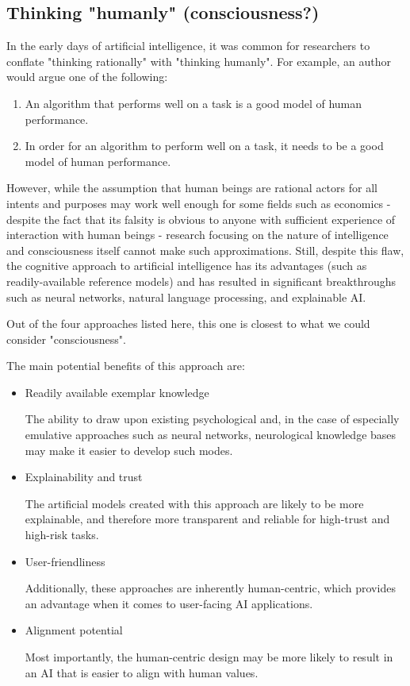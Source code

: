 \documentclass[masterthesis]{fer}
\begin{document}
\subsection{Thinking "humanly" (consciousness?)}
In the early days of artificial intelligence, it was common for researchers to conflate "thinking rationally" with "thinking humanly". For example, an author would argue one of the following:
\begin{enumerate}
\item{An algorithm that performs well on a task is a good model of human performance.}
\item{In order for an algorithm to perform well on a task, it needs to be a good model of human performance.}
\end{enumerate}
However, while the assumption that human beings are rational actors for all intents and purposes may work well enough for some fields such as economics - despite the fact that its falsity is obvious to anyone with sufficient experience of interaction with human beings - research focusing on the nature of intelligence and consciousness itself cannot make such approximations.
Still, despite this flaw, the cognitive approach to artificial intelligence has its advantages (such as readily-available reference models) and has resulted in significant breakthroughs such as neural networks, natural language processing, and explainable AI.

Out of the four approaches listed here, this one is closest to what we could consider "consciousness".

The main potential benefits of this approach are:
\begin{itemize}
\item{Readily available exemplar knowledge}

The ability to draw upon existing psychological and, in the case of especially emulative approaches such as neural networks, neurological knowledge bases may make it easier to develop such modes.
\item{Explainability and trust}

The artificial models created with this approach are likely to be more explainable, and therefore more transparent and reliable for high-trust and high-risk tasks.
\item{User-friendliness}

Additionally, these approaches are inherently human-centric, which provides an advantage when it comes to user-facing AI applications.
\item{Alignment potential}

Most importantly, the human-centric design may be more likely to result in an AI that is easier to align with human values.
\end{itemize}
\end{document}
